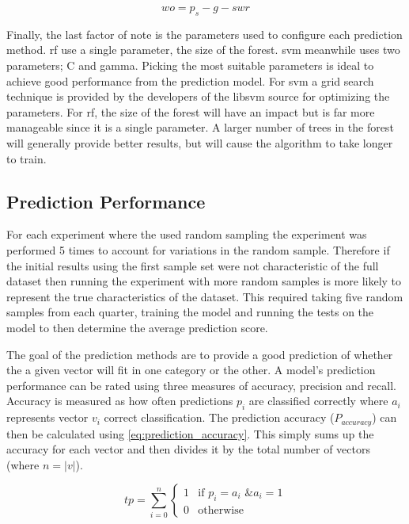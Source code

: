 \begin{equation} 
\label{eq:window_offset}
wo = p_s - g - swr 
\end{equation}

Finally, the last factor of note is the parameters used to configure each prediction method. \gls{rf} use a single parameter, the size of the forest. \gls{svm} meanwhile uses two parameters; C and gamma. Picking the most suitable parameters is ideal to achieve good performance from the prediction model. For \gls{svm} a grid search technique is provided by the developers of the libsvm source %
for optimizing the parameters. For \gls{rf}, the size of the forest will have an impact but is far more manageable since it is a single parameter. A larger number of trees in the forest will generally provide better results, but will cause the algorithm to take longer to train.

\subsection{Prediction Performance}

For each experiment where the used random sampling the experiment was performed 5 times to account for variations in the random sample. Therefore if the initial results using the first sample set were not characteristic of the full dataset then running the experiment with more random samples is more likely to represent the true characteristics of the dataset. This required taking five random samples from each quarter, training the model and running the tests on the model to then determine the average prediction score. %

The goal of the prediction methods are to provide a good prediction of whether the a given vector will fit in one category or the other. A model's prediction performance can be rated using three measures of accuracy, precision and recall. Accuracy is measured as how often predictions $p_i$ are classified correctly where $a_i$ represents vector $v_i$ correct classification. The prediction accuracy ($P_{accuracy}$) can then be calculated using \autoref{eq:prediction_accuracy}. This simply sums up the accuracy for each vector and then divides it by the total number of vectors (where $n = |v|$).

\begin{equation}
\label{eq:true_positive}
tp = \sum_{i=0}^{n}\left\{\begin{matrix}
1 & \text{if } p_i = a_i \text{ \& } a_i = 1\\ 
0 & \text{otherwise}
\end{matrix}\right.
\end{equation}

